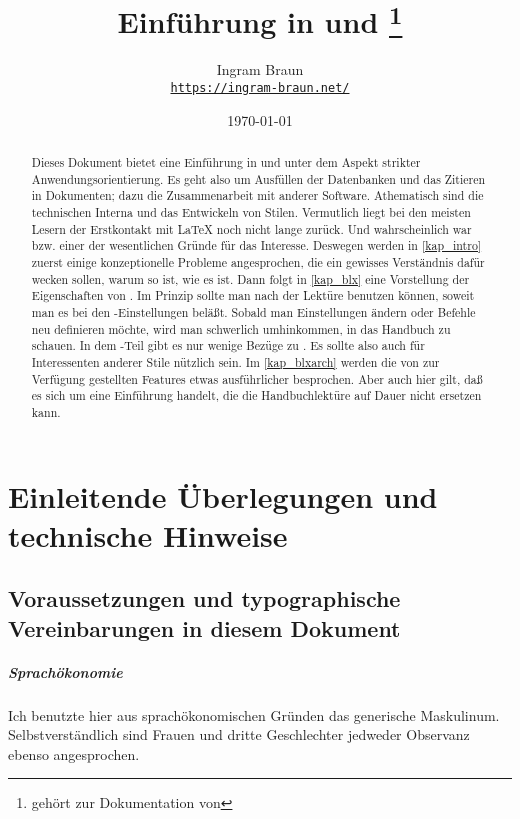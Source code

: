 \documentclass[
	11pt,        %
	table,       %
	twoside,     %
	notitlepage, %
]{scrreprt}
\title{Einführung in \blx{} und \archbib\thanks{gehört zur Dokumentation von \archbib{~v.2.3.0}}}
\author{Ingram Braun\\\href{https://ingram-braun.net/}{\texttt{https://ingram-braun.net/}}}
\date{\today}
\newcommand{\IfTeXforHt}[2]{\ifdefined\HCode#1\else#2\fi} %
\begin{document}
\IfTeXforHt{}{\maketitle}

\begin{abstract}
Dieses Dokument bietet eine Einführung in \blx{} und \archbib{} unter dem Aspekt strikter Anwendungsorientierung. Es geht also um Ausfüllen der
Datenbanken und das Zitieren in Dokumenten; dazu die Zusammenarbeit mit anderer Software. Athematisch sind die technischen Interna und
das Entwickeln von Stilen.
Vermutlich liegt bei den meisten Lesern der Erstkontakt mit \LaTeX{} noch nicht lange zurück. Und wahrscheinlich war \blx{} bzw. \archbib{} einer der wesentlichen Gründe für das Interesse. Deswegen werden in \cref{kap_intro} zuerst einige konzeptionelle Probleme angesprochen, die ein gewisses Verständnis dafür wecken sollen, warum \blx{} so ist, wie es ist. Dann folgt in \cref{kap_blx} eine Vorstellung der Eigenschaften von \blx. Im Prinzip sollte man nach der Lektüre \blx{} benutzen können, soweit man es bei den -Einstellungen beläßt. Sobald man Einstellungen ändern oder Befehle neu definieren möchte, wird man schwerlich umhinkommen, in das Handbuch zu schauen. In dem \blx-Teil gibt es nur wenige Bezüge zu \archbib. Es sollte also auch für Interessenten anderer Stile nützlich sein. Im \cref{kap_blxarch} werden die von \archbib{} zur Verfügung gestellten Features etwas ausführlicher besprochen. Aber auch hier gilt, daß es sich um eine Einführung handelt, die die Handbuchlektüre auf Dauer nicht ersetzen kann.
\end{abstract}
 
\tableofcontents

\chapter{Einleitende Überlegungen und technische Hinweise}\label{kap_intro}

\section{Voraussetzungen und typographische Vereinbarungen in diesem Dokument}

\paragraph{Sprachökonomie} Ich benutzte hier aus sprachökonomischen Gründen das generische Maskulinum. Selbstverständlich sind Frauen und dritte Geschlechter jedweder Observanz ebenso angesprochen.
\end{document}
